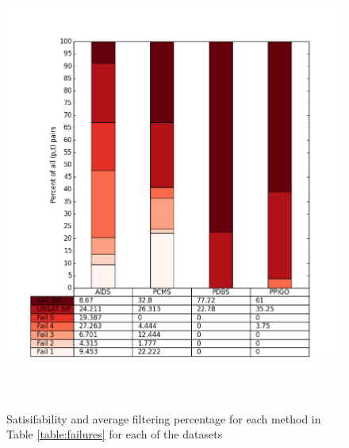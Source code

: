 \documentclass{l4proj}
\begin{document}
\begin{figure}[H]
\centering
\includegraphics[height=15cm,width=13.5cm]{images/plots/splittedSIP.png}
\caption{Satisifability and average filtering percentage for each method in Table \ref{table:failures} for each of the datasets}
\label{averageFailures}
\end{figure}
\end{document}
